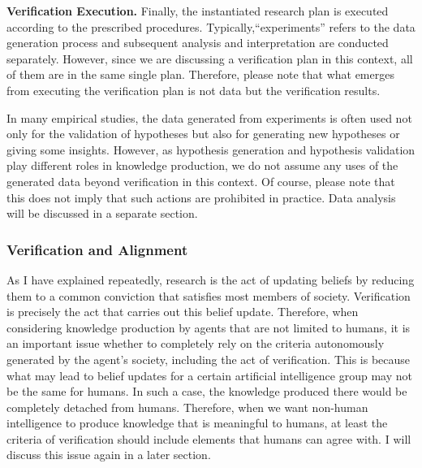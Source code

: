 \documentclass{book}
\begin{document}
\textbf{Verification Execution.} Finally, the instantiated research plan is executed according to the prescribed procedures. Typically,``experiments'' refers to the data generation process and subsequent analysis and interpretation are conducted separately. However, since we are discussing a verification plan in this context, all of them are in the same single plan. Therefore, please note that what emerges from executing the verification plan is not data but the verification results.

In many empirical studies, the data generated from experiments is often used not only for the validation of hypotheses but also for generating new hypotheses or giving some insights. However, as hypothesis generation and hypothesis validation play different roles in knowledge production, we do not assume any uses of the generated data beyond verification in this context. Of course, please note that this does not imply that such actions are prohibited in practice. Data analysis will be discussed in a separate section.




\subsubsection{Verification and Alignment}

As I have explained repeatedly, research is the act of updating beliefs by reducing them to a common conviction that satisfies most members of society. Verification is precisely the act that carries out this belief update. Therefore, when considering knowledge production by agents that are not limited to humans, it is an important issue whether to completely rely on the criteria autonomously generated by the agent's society, including the act of verification. This is because what may lead to belief updates for a certain artificial intelligence group may not be the same for humans. In such a case, the knowledge produced there would be completely detached from humans. Therefore, when we want non-human intelligence to produce knowledge that is meaningful to humans, at least the criteria of verification should include elements that humans can agree with. I will discuss this issue again in a later section.
\end{document}

